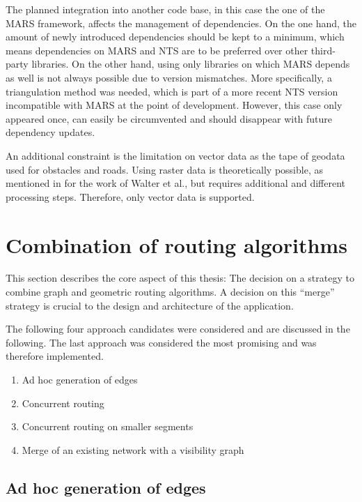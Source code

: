 		The planned integration into another code base, in this case the one of the MARS framework, affects the management of dependencies.
		On the one hand, the amount of newly introduced dependencies should be kept to a minimum, which means dependencies on MARS and NTS are to be preferred over other third-party libraries.
		On the other hand, using only libraries on which MARS depends as well is not always possible due to version mismatches.
		More specifically, a triangulation method was needed, which is part of a more recent NTS version incompatible with MARS at the point of development.
		However, this case only appeared once, can easily be circumvented and should disappear with future dependency updates.
		
		An additional constraint is the limitation on vector data as the tape of geodata used for obstacles and roads.
		Using raster data is theoretically possible, as mentioned in  for the work of Walter et al., but requires additional and different processing steps.
		Therefore, only vector data is supported.
	
\section{Combination of routing algorithms}
\label{sec:combining-routing-algorithms}

	This section describes the core aspect of this thesis:
	The decision on a strategy to combine graph and geometric routing algorithms.
	A decision on this \enquote{merge} strategy is crucial to the design and architecture of the application.
	
	The following four approach candidates were considered and are discussed in the following.
	The last approach was considered the most promising and was therefore implemented.
	\begin{enumerate}
		\item Ad hoc generation of edges
		\item Concurrent routing
		\item Concurrent routing on smaller segments
		\item Merge of an existing network with a visibility graph
	\end{enumerate}
	
	\subsection{Ad hoc generation of edges}
	
